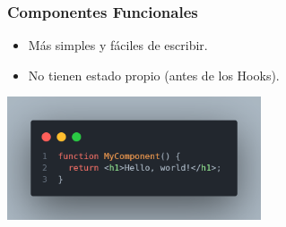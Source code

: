 \documentclass[10pt]{beamer}
\begin{document}
\begin{frame}[fragile]
  \frametitle{Componentes Funcionales}
  \begin{itemize}
    \item Más simples y fáciles de escribir.
    \item No tienen estado propio (antes de los Hooks).
  \end{itemize}
    \includegraphics[width=75mm,scale=0.25]{myComponentFunction.png}
\end{frame}
\end{document}
